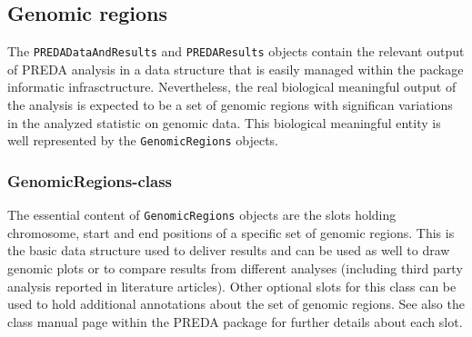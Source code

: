 \documentclass[a4paper,10pt]{article}
\begin{document}
\subsection{Genomic regions}
The \texttt{PREDADataAndResults} and \texttt{PREDAResults} objects contain the relevant output of PREDA analysis in a data structure that is easily managed within the package informatic infrasctructure. Nevertheless, the real biological meaningful output of the analysis is expected to be a set of genomic regions with significan variations in the analyzed statistic on genomic data. This biological meaningful entity is well represented by the \texttt{GenomicRegions} objects.

\subsubsection{GenomicRegions-class}

The essential content of \texttt{GenomicRegions} objects are the slots holding chromosome, start and end positions of a specific set of genomic regions. This is the basic data structure used to deliver results and can be used as well to draw genomic plots or to compare results from different analyses (including third party analysis reported in literature articles). Other optional slots for this class can be used to hold additional annotations about the set of genomic regions.  See also the class manual page within the PREDA package for further details about each slot.

% 
% 
\end{document}
